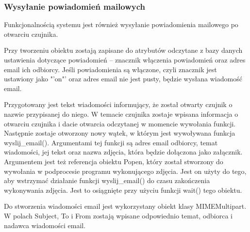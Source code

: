 \documentclass[a4paper,12pt,twoside]{article}
\begin{document}
\subsubsection{Wysyłanie powiadomień mailowych}
Funkcjonalnością systemu jest również wysyłanie powiadomienia mailowego po otwarciu czujnika. 

Przy tworzeniu obiektu zostają zapisane do atrybutów odczytane z bazy danych ustawienia dotyczące powiadomień -- znacznik włączenia powiadomień oraz adres email ich odbiorcy. Jeśli powiadomienia są włączone, czyli znacznik jest ustawiony jako "'on"' oraz adres email nie jest pusty, będzie wysłana wiadomość email.

Przygotowany jest tekst wiadomości informujący, że został otwarty czujnik o nazwie przypisanej do niego. W temacie czujnika zostaje wpisana informacja o otwarciu czujnika i dacie otwarcia odczytanej w momencie wywołania funkcji. Następnie zostaje otworzony nowy wątek, w którym jest wywoływana funkcja wyslij{\_}email(). Argumentami tej funkcji są adres email odbiorcy, temat wiadomości, jej tekst oraz nazwa zdjęcia, która będzie dołączona jako załącznik. Argumentem jest też referencja obiektu Popen, który został stworzony do wywołania w podprocesie programu wykonującego zdjęcia. Jest on użyty do tego, aby wstrzymać działanie funkcji wyslij{\_}email() do czasu zakończenia wykonywania zdjęcia. Jest to osiągnięte przy użyciu funkcji wait() tego obiektu.

Do stworzenia wiadomości email jest wykorzystany obiekt klasy MIMEMultipart. W polach Subject, To i From zostają wpisane odpowiednio temat, odbiorca i nadawca wiadomości email. 
\end{document}
